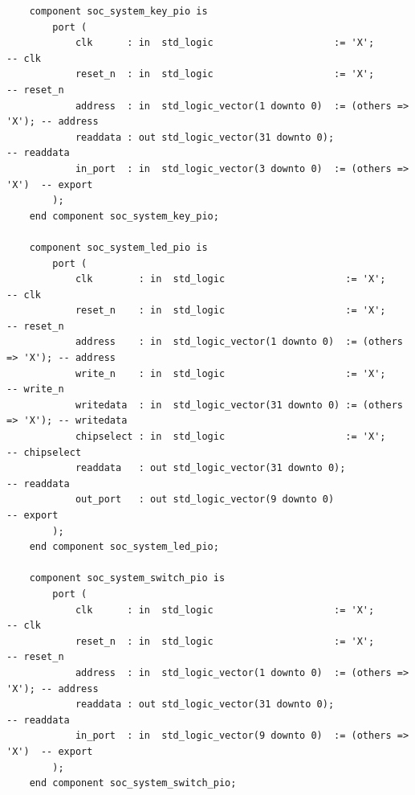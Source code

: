 \documentclass[conference]{IEEEtran}
\begin{document}
\begin{lstlisting}
	component soc_system_key_pio is
		port (
			clk      : in  std_logic                     := 'X';             -- clk
			reset_n  : in  std_logic                     := 'X';             -- reset_n
			address  : in  std_logic_vector(1 downto 0)  := (others => 'X'); -- address
			readdata : out std_logic_vector(31 downto 0);                    -- readdata
			in_port  : in  std_logic_vector(3 downto 0)  := (others => 'X')  -- export
		);
	end component soc_system_key_pio;

	component soc_system_led_pio is
		port (
			clk        : in  std_logic                     := 'X';             -- clk
			reset_n    : in  std_logic                     := 'X';             -- reset_n
			address    : in  std_logic_vector(1 downto 0)  := (others => 'X'); -- address
			write_n    : in  std_logic                     := 'X';             -- write_n
			writedata  : in  std_logic_vector(31 downto 0) := (others => 'X'); -- writedata
			chipselect : in  std_logic                     := 'X';             -- chipselect
			readdata   : out std_logic_vector(31 downto 0);                    -- readdata
			out_port   : out std_logic_vector(9 downto 0)                      -- export
		);
	end component soc_system_led_pio;

	component soc_system_switch_pio is
		port (
			clk      : in  std_logic                     := 'X';             -- clk
			reset_n  : in  std_logic                     := 'X';             -- reset_n
			address  : in  std_logic_vector(1 downto 0)  := (others => 'X'); -- address
			readdata : out std_logic_vector(31 downto 0);                    -- readdata
			in_port  : in  std_logic_vector(9 downto 0)  := (others => 'X')  -- export
		);
	end component soc_system_switch_pio;


\end{lstlisting}
\end{document}
